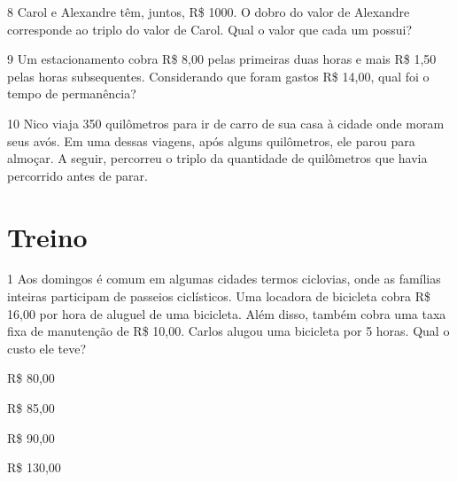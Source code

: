 \pagebreak
\num{8} Carol e Alexandre têm, juntos, R\$ 1000. O dobro do
valor de Alexandre corresponde ao triplo do valor de Carol. Qual o valor
que cada um possui?

\begin{emptybox}

\vspace*{3cm}
\end{emptybox}

\num{9} Um estacionamento cobra R\$ 8,00 pelas primeiras duas horas e mais
R\$ 1,50 pelas horas subsequentes. Considerando que foram gastos R\$
14,00, qual foi o tempo de permanência?

\begin{emptybox}

\vspace*{3cm}
\end{emptybox}

\num{10} Nico viaja 350 quilômetros para ir de carro de sua casa à cidade
onde moram seus avós. Em uma dessas viagens, após alguns quilômetros,
ele parou para almoçar. A seguir, percorreu o triplo da quantidade de
quilômetros que havia percorrido antes de parar.

\begin{emptybox}
\vspace*{3cm}
\end{emptybox}

\section*{Treino}

\num{1} Aos domingos é comum em algumas cidades termos ciclovias, onde as
famílias inteiras participam de passeios ciclísticos. Uma locadora de bicicleta
cobra R\$ 16,00 por hora de aluguel de uma bicicleta. Além disso,
também cobra uma taxa fixa de manutenção de R\$ 10,00. Carlos alugou uma
bicicleta por 5 horas. Qual o custo ele teve?

\begin{escolha}

  \item R\$ 80,00

  \item R\$ 85,00

  \item R\$ 90,00

  \item R\$ 130,00

\end{escolha}


